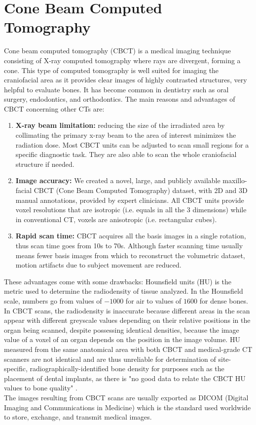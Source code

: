 \section{Cone Beam Computed Tomography}
Cone beam computed tomography (CBCT) is a medical imaging technique consisting
of X-ray computed tomography where rays are divergent, forming a cone. This type
of computed tomography is well suited for imaging the craniofacial area as it
provides clear images of highly contrasted structures, very helpful to
evaluate bones. It has become common in dentistry such as oral surgery,
endodontics, and orthodontics.
The main reasons and advantages of CBCT concerning other CTs are:
\begin{enumerate}
  \item{\textbf{X-ray beam limitation:} reducing the size of the irradiated area
  by collimating the primary x-ray beam to the area of interest minimizes the
  radiation dose. Most CBCT units can be adjusted to scan small regions for
  a specific diagnostic task. They are also able to scan the whole craniofacial
  structure if needed.}
  \item{\textbf{Image accuracy:} We created a novel, large, and publicly
  available maxillo-facial CBCT (Cone Beam Computed Tomography) dataset, with 2D
  and 3D manual annotations, provided by expert clinicians. All CBCT units
  provide voxel resolutions that are isotropic (i.e. equals in all the 3
  dimensions) while in conventional CT, voxels are anisotropic (i.e. rectangular
  cubes).}
  \item{\textbf{Rapid scan time:} CBCT acquires all the basis images in a single
  rotation, thus scan time goes from 10s to 70s. Although faster scanning time
  usually means fewer basis images from which to reconstruct the volumetric
  dataset, motion artifacts due to subject movement are reduced.}
\end{enumerate}
These advantages come with some drawbacks: Hounsfield units (HU) is the metric
used to determine the radiodensity of tissue analyzed. In the Hounsfield scale,
numbers go from values of $-1000$ for air to values of $1600$ for dense bones.
In CBCT scans, the radiodensity is inaccurate because different areas in the
scan appear with different greyscale values depending on their relative
positions in the organ being scanned, despite possessing identical densities,
because the image value of a voxel of an organ depends on the position in the
image volume. HU measured from the same anatomical area with both CBCT and
medical-grade CT scanners are not identical and are thus unreliable for
determination of site-specific, radiographically-identified bone density for
purposes such as the placement of dental implants, as there is "no good data to
relate the CBCT HU values to bone quality" \cite{Miles2007}.\\
The images resulting from CBCT scans are usually exported as DICOM (Digital
Imaging and Communications in Medicine) which is the standard used worldwide to
store, exchange, and transmit medical images.

